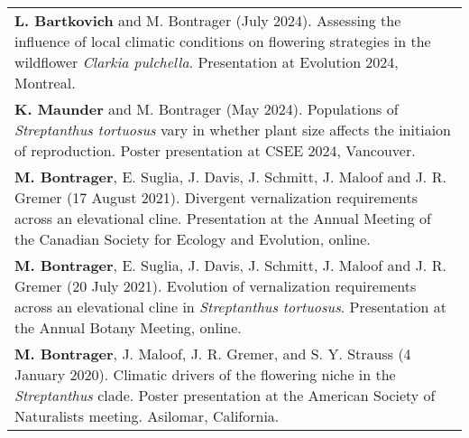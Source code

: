 \documentclass[letterpaper,11pt,oneside]{article}
\begin{document}
\def\arraystretch{1.2}
\noindent \begin{tabular}{@{} >{\raggedright\arraybackslash}p{17.2cm}}
\hangindent=5mm\textbf{L. Bartkovich} and M. Bontrager (July 2024). Assessing the influence of local climatic conditions on flowering strategies in the wildflower \textit{Clarkia pulchella}. Presentation at Evolution 2024, Montreal. \\
\hangindent=5mm\textbf{K. Maunder} and M. Bontrager (May 2024). Populations of \textit{Streptanthus tortuosus} vary in whether plant size affects the initiaion of reproduction. Poster presentation at CSEE 2024, Vancouver. \\
\hangindent=5mm\textbf{M. Bontrager}, E. Suglia, J. Davis, J. Schmitt, J. Maloof and J. R. Gremer (17 August 2021). Divergent vernalization requirements across an elevational cline. Presentation at the Annual Meeting of the Canadian Society for Ecology and Evolution, online. \\
\hangindent=5mm\textbf{M. Bontrager}, E. Suglia, J. Davis, J. Schmitt, J. Maloof and J. R. Gremer (20 July 2021). Evolution of vernalization requirements across an elevational cline in \textit{Streptanthus tortuosus}. Presentation at the Annual Botany Meeting, online. \\
\hangindent=5mm\textbf{M. Bontrager}, J. Maloof, J. R. Gremer, and S. Y. Strauss (4 January 2020). Climatic drivers of the flowering niche in the \textit{Streptanthus} clade. Poster presentation at the American Society of Naturalists meeting. Asilomar, California. \\


\end{tabular}
\end{document}
